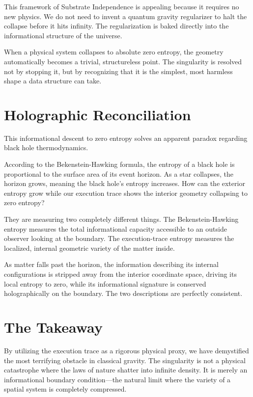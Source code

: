 This framework of Substrate Independence is appealing because it requires no new physics.
We do not need to invent a quantum gravity regularizer to halt the collapse before it hits infinity.
The regularization is baked directly into the informational structure of the universe. 

When a physical system collapses to absolute zero entropy, the geometry automatically becomes a trivial,
structureless point. The singularity is resolved not by stopping it, but by recognizing that it is the simplest,
most harmless shape a data structure can take.

\section{Holographic Reconciliation}

This informational descent to zero entropy solves an apparent paradox regarding black hole thermodynamics. 

According to the Bekenstein-Hawking formula, the entropy of a black hole is proportional to the surface area
of its event horizon. As a star collapses, the horizon grows, meaning the black hole's entropy increases.
How can the exterior entropy grow while our execution trace shows the interior geometry collapsing to zero entropy?

They are measuring two completely different things. The Bekenstein-Hawking entropy measures the total
informational capacity accessible to an outside observer looking at the boundary.
The execution-trace entropy measures the localized, internal geometric variety of the matter inside. 

As matter falls past the horizon, the information describing its internal configurations is stripped away
from the interior coordinate space, driving its local entropy to zero, while its informational signature is
conserved holographically on the boundary. The two descriptions are perfectly consistent.

\section{The Takeaway}

By utilizing the execution trace as a rigorous physical proxy,
we have demystified the most terrifying obstacle in classical gravity.
The singularity is not a physical catastrophe where the laws of nature shatter into infinite density.
It is merely an informational boundary condition—the natural limit where the variety of a
spatial system is completely compressed. 


